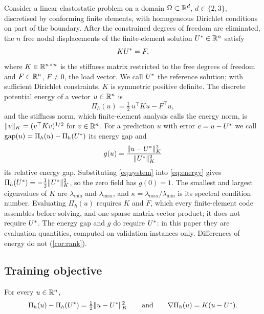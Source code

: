 Consider a linear elastostatic problem on a domain $\Omega\subset\mathbb{R}^{d}$, $d\in\{2,3\}$,
discretised by conforming finite elements, with homogeneous Dirichlet conditions on part
of the boundary. After the constrained degrees of freedom are eliminated, the $n$ free
nodal displacements of the finite-element solution $U^{\ast}\in\mathbb{R}^{n}$ satisfy
\begin{equation}
KU^{\ast} = F,
\label{eq:system}
\end{equation}
where $K\in\mathbb{R}^{n\times n}$ is the stiffness matrix restricted to the free degrees of
freedom and $F\in\mathbb{R}^{n}$, $F\neq0$, the load vector. We call $U^{\ast}$ the reference
solution; with sufficient Dirichlet constraints, $K$ is symmetric positive definite. The
discrete potential energy of a vector $u\in\mathbb{R}^{n}$ is
\begin{equation}
\Pi_h(u) = \tfrac12\,u^{\top}Ku - F^{\top}u ,
\label{eq:energy}
\end{equation}
and the stiffness norm, which finite-element analysis calls the energy norm, is
$\lVert v\rVert_K=(v^{\top}Kv)^{1/2}$ for $v\in\mathbb{R}^{n}$. For a prediction $u$ with error
$e=u-U^{\ast}$ we call $\operatorname{gap}(u)=\Pi_h(u)-\Pi_h(U^{\ast})$ its energy gap and
\begin{equation}
g(u) = \frac{\lVert u-U^{\ast}\rVert_K^{2}}{\lVert U^{\ast}\rVert_K^{2}}
\label{eq:relgap}
\end{equation}
its relative energy gap. Substituting \eqref{eq:system} into \eqref{eq:energy} gives
$\Pi_h(U^{\ast})=-\tfrac12\lVert U^{\ast}\rVert_K^2$, so the zero field has $g(0)=1$. The smallest
and largest eigenvalues of $K$ are $\lambda_{\min}$ and $\lambda_{\max}$, and
$\kappa=\lambda_{\max}/\lambda_{\min}$ is its spectral condition number. Evaluating
$\Pi_h(u)$ requires $K$ and $F$, which every finite-element code assembles before solving,
and one sparse matrix-vector product; it does not require $U^{\ast}$. The energy gap and
$g$ do require $U^{\ast}$: in this paper they are evaluation quantities, computed on
validation instances only. Differences of energy do not (\cref{cor:rank}).

\subsection{Training objective}\label{sec:theory:exact}

\begin{lemma}[Exactness]\label{lem:exact}
For every $u\in\mathbb{R}^{n}$,
\begin{equation}
\Pi_h(u)-\Pi_h(U^{\ast}) = \tfrac12\lVert u-U^{\ast}\rVert_K^{2}
\qquad\text{and}\qquad
\nabla\Pi_h(u) = K(u-U^{\ast}).
\label{eq:exact}
\end{equation}
\end{lemma}

